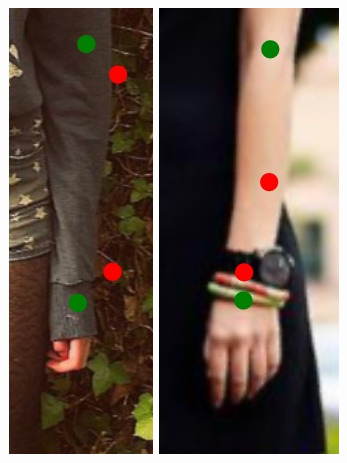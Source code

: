 
\begin{figure}
    \newcommand{\fh}{0.228\columnwidth}
    \centering
    \includegraphics[height=\fh]{resources/Annotation_Correction/Fixing/fix_1}
    \hfill
    \includegraphics[height=\fh]{resources/Annotation_Correction/Fixing/fix_2}
    \hfill

\end{figure}
